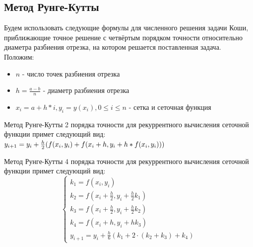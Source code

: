 \documentclass[a4paper,12pt,titlepage,finall]{article}
\begin{document}
\subsection{Метод Рунге-Кутты}
Будем использовать следующие формулы для численного решения задачи Коши, приближающие точное решение с четвёртым порядком точности относительно диаметра разбиения отрезка, на котором решается поставленная задача.\\
Положим:\\
\begin{itemize}
\item $n$ - число точек разбиения отрезка\\
\item $ h=\frac{a - b}{n}$ - диаметр разбиения отрезка\\
\item $ x_{i} = a + h * i, y_{i} = y(x_{i}), 0 \leq i \leq n $ - сетка и сеточная функция\\
\end{itemize}

Метод Рунге-Кутты 2 порядка точности для рекуррентного вычисления сеточной функции примет следующий вид:
~\\

			$y_{i + 1} = y_{i} + \frac{h}{2}(f(x_{i},y_{i}) + f(x_{i} + h, y_{i} + h * f(x_{i}, y_{i})))\\$




Метод Рунге-Кутты 4 порядка точности для рекуррентного вычисления сеточной функции примет следующий вид:
	\begin{equation*}
		\begin{cases}
			k_{1} = f(x_{i}, y_{i})\\
			k_{2} = f(x_{i} + \frac{h}{2}, y_{i} + \frac{h}{2}k_{1})\\
			k_{3} = f(x_{i} + \frac{h}{2}, y_{i} + \frac{h}{2}k_{2})\\
			k_{4} = f(x_{i} + h, y_{i} + hk_{3})\\
			y_{i + 1} = y_{i} + \frac{h}{6}(k_{1} + 2 \cdot (k_{2} + k_{3}) + k_{4})
		\end{cases}
\end{equation*}


\newpage
\end{document}
